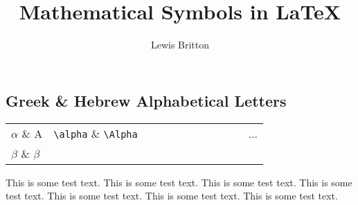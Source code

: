 \documentclass[10pt, english]{article}
\begin{document}

	\title{Mathematical Symbols in {\LaTeX}}
	\author{Lewis Britton}
	\date{}
	\maketitle

\subsection*{Greek \& Hebrew Alphabetical Letters}

	\begin{center}
	\begin{tabular}{p{1cm}p{3cm}p{0.5cm}p{1.5cm}p{0.5cm}p{1.5cm}p{0.5cm}p{1.5cm}p{0.5cm}p{1.5cm}p{0.5cm}p{1.5cm}}
		\hline
		$\alpha$ \& A & \texttt{\textbackslash alpha} \& \texttt{\textbackslash Alpha} & & & & & & & & & & ...\\
		$\beta$ \& $\beta$ & \\
		\hline
	\end{tabular}
	\end{center}


This is some test text. This is some test text. This is some test text. This is some test text. This is some test text. This is some test text. This is some test text.
\end{document}
